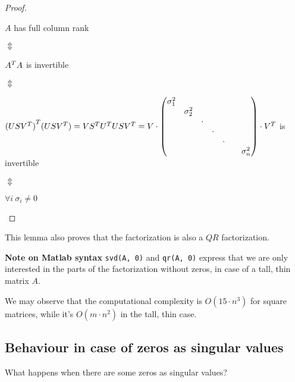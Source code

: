 \documentclass[computationalMathematics.tex]{subfiles}
\begin{document}
\begin{proof}
  \begin{center}
  $A$ has full column rank 
  
  $\Updownarrow$

  ${A}^{T}A$ is invertible
  
$\Updownarrow$
  
  ${(US{V}^{T})}^{T} (US{V}^{T}) = V{S}^{T}{U}^{T}US{V}^{T}
    = V \cdot  \begin{pmatrix}
    \sigma_{1}^2 & & & & &\\
    & \sigma_{2}^2 & & & &\\
    & & \cdot & & &\\
    & & & \cdot & &\\
    & & & & \cdot &\\
    & & & & & & \sigma_{n}^2\\ 
  \end{pmatrix} \cdot {V}^{T}$
  is invertible 
  
$\Updownarrow$
  
  $\forall i ~ \sigma_i \neq 0$
\end{center}
\end{proof}

\begin{obs}
This lemma also proves that the factorization is also a $QR$ factorization.
\end{obs}
\begin{myframe}{\bf Note on Matlab syntax}
  \texttt{svd(A, 0)} and \texttt{qr(A, 0)} express that we are only interested in the parts of the factorization without zeros, in case of a tall, thin matrix $A$.
\end{myframe}
 We may observe that the computational complexity is $O(15 \cdot n^3)$ for square matrices, while it's $O(m \cdot n^2)$ in the tall, thin case.

 \subsection{Behaviour in case of zeros as singular values}
 What happens when there are some zeros as singular values? 
 
\end{document}
